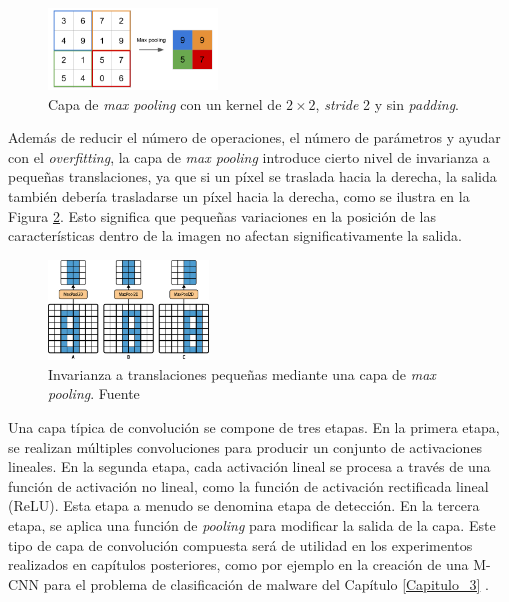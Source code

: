 \begin{figure}[h!]
\centering
\includegraphics[width=0.4\textwidth]{img/maxpooling.png}
\caption{Capa de \textit{max pooling} con un kernel de \( 2 \times 2 \), \textit{stride} 2 y sin \textit{padding}.}
\label{fig:maxpooling}
\end{figure}

Además de reducir el número de operaciones, el número de parámetros y ayudar con el \textit{overfitting}, la capa de \textit{max pooling} introduce cierto nivel de invarianza a pequeñas translaciones, ya que si un píxel se traslada hacia la derecha, la salida también debería trasladarse un píxel hacia la derecha, como se ilustra en la Figura \ref{fig:translacionPooling}. Esto significa que pequeñas variaciones en la posición de las características dentro de la imagen no afectan significativamente la salida.


\begin{figure}[h!]
\centering
\includegraphics[width=0.38\textwidth]{img/translacionPooling.png}
\caption{Invarianza a translaciones pequeñas mediante una capa de \textit{max pooling}. Fuente \citep{geron2022hands}}
\label{fig:translacionPooling}
\end{figure}

Una capa típica de convolución se compone de tres etapas. En la primera etapa, se realizan múltiples convoluciones para producir un conjunto de activaciones lineales. En la segunda etapa, cada activación lineal se procesa a través de una función de activación no lineal, como la función de activación rectificada lineal (ReLU). Esta etapa a menudo se denomina etapa de detección. En la tercera etapa, se aplica una función de \textit{pooling} para modificar la salida de la capa. Este tipo de capa de convolución compuesta será de utilidad en los experimentos realizados en capítulos posteriores, como por ejemplo en la creación de una M-CNN para el problema de clasificación de malware del Capítulo \ref{Capitulo_3} \citep{pajares2021aprendizaje}.


